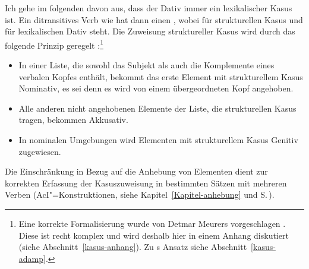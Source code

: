 Ich gehe im folgenden davon aus, dass der Dativ immer ein lexikalischer Kasus ist. 
Ein ditransitives Verb wie  hat dann einen \compsw {},
wobei  für strukturellen Kasus und  für lexikalischen Dativ steht.
Die Zuweisung struktureller Kasus wird durch das folgende Prinzip geregelt \parencites{Prze99}{Meurers99b}[Kapitel~10.4.1.4]{Meurers2000b}{MdK2001a}[Kapitel~7.2]{MuellerGermanic}:\footnote{
  Eine korrekte Formalisierung wurde von Detmar Meurers
  vorgeschlagen \parencites{Meurers99b}{MdK2001a}[Kapitel~10.4.1.4]{Meurers2000b}.
  Diese ist recht komplex und wird deshalb hier in einem Anhang diskutiert (siehe Abschnitt~\ref{kasus-anhang}).
  Zu \prz{}s Ansatz siehe Abschnitt~\ref{kasus-adamp}.%
}
\begin{prinzip-break}[Kasusprinzip]
\label{case-p}
\begin{itemize}
\item In einer Liste, die sowohl das Subjekt als auch die Komplemente eines verbalen Kopfes
      enthält, bekommt das erste Element mit strukturellem Kasus 
      Nominativ, es sei denn es wird von einem übergeordneten Kopf angehoben.
\item Alle anderen nicht angehobenen Elemente der Liste, die strukturellen Kasus tragen, bekommen Akkusativ.
\item In nominalen Umgebungen wird Elementen mit strukturellem Kasus Genitiv zugewiesen.
\end{itemize}
\end{prinzip-break}
Die Einschränkung in Bezug auf die Anhebung von Elementen dient zur korrekten Erfassung der
Kasuszuweisung in bestimmten Sätzen mit mehreren Verben (\zb AcI"=Konstruktionen, siehe
Kapitel~\ref{Kapitel-anhebung} und S.\,\pageref{page-aci-kasus}).

